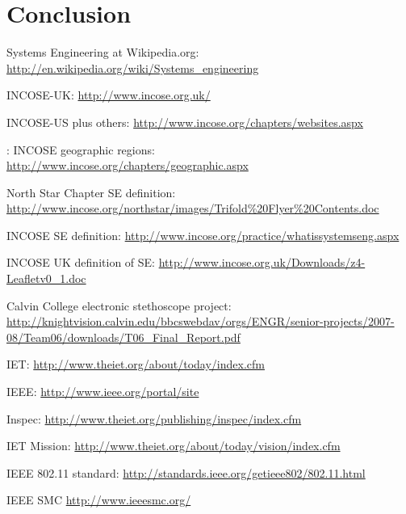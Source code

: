 \documentclass[a4paper,12pt]{article}
\begin{document}
\section{Conclusion}

\newpage
{}
\begin{thebibliography}{100}
	
 Systems Engineering at Wikipedia.org: \url{http://en.wikipedia.org/wiki/Systems_engineering}

 INCOSE-UK: \url{http://www.incose.org.uk/}

 INCOSE-US plus others: \url{http://www.incose.org/chapters/websites.aspx}

: INCOSE geographic regions:\\
\url{http://www.incose.org/chapters/geographic.aspx}

 North Star Chapter SE definition: \url{http://www.incose.org/northstar/images/Trifold%20Flyer%20Contents.doc}

 INCOSE SE definition: \url{http://www.incose.org/practice/whatissystemseng.aspx}

 INCOSE UK definition of SE: \url{http://www.incose.org.uk/Downloads/z4-Leafletv0_1.doc}

 Calvin College electronic stethoscope project: \url{http://knightvision.calvin.edu/bbcswebdav/orgs/ENGR/senior-projects/2007-08/Team06/downloads/T06_Final_Report.pdf}

 IET: \url{http://www.theiet.org/about/today/index.cfm}

 IEEE: \url{http://www.ieee.org/portal/site}

 Inspec: \url{http://www.theiet.org/publishing/inspec/index.cfm}

 IET Mission: \url{http://www.theiet.org/about/today/vision/index.cfm}

 IEEE 802.11 standard: \url{http://standards.ieee.org/getieee802/802.11.html}

 IEEE SMC \url{http://www.ieeesmc.org/}

\end{thebibliography}
\end{document}
